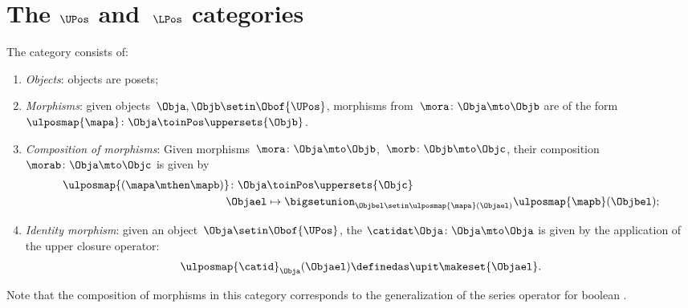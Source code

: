 \section{The $\UPos$ and~$\LPos$ categories}

\begin{definition}
    \label{def:upos_cat}
    The category \UPos consists of:
    \begin{enumerate}
        \item \emph{Objects}: objects are posets;
        \item \emph{Morphisms}: given objects~$\Obja,\Objb\setin \Obof{\UPos}$, morphisms from~$\mora\colon \Obja \mto \Objb$ are  of the form~$\ulposmap{\mapa} \colon \Obja \toinPos \uppersets{\Objb}$.
        \item \emph{Composition of morphisms}: Given morphisms~$\mora\colon \Obja \mto \Objb$,~$\morb\colon \Objb\mto \Objc$, their composition~$\morab\colon \Obja\mto \Objc$ is given by
              \begin{equation}
                  \begin{aligned}
                      \ulposmap{(\mapa \mthen \mapb)} \colon \Obja & \toinPos \uppersets{\Objc} \\
                      \Objael                                      & \mapsto \bigsetunion_{\Objbel\setin \ulposmap{\mapa}(\Objael)}\ulposmap{\mapb}(\Objbel);
                  \end{aligned}
              \end{equation}
        \item \emph{Identity morphism}: given an object~$\Obja\setin \Obof{\UPos}$, the  $\catidat\Obja \colon \Obja \mto \Obja$ is given by the application of the upper closure operator:
              \begin{equation}
                  \ulposmap{\catid}_\Obja(\Objael)\definedas \upit\makeset{\Objael}.
              \end{equation}
    \end{enumerate}
\end{definition}

\begin{remark}
    Note that the composition of morphisms in this category corresponds to the generalization of the series operator for boolean .
\end{remark}

